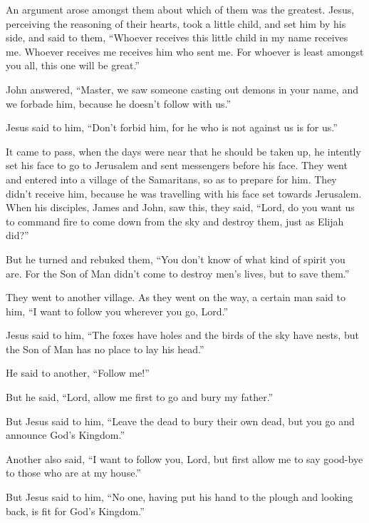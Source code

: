  An argument arose amongst them about which of them was
the greatest.  Jesus, perceiving the reasoning of their
hearts, took a little child, and set him by his side, 
and said to them, ``Whoever receives this little child in my name
receives me. Whoever receives me receives him who sent me. For whoever
is least amongst you all, this one will be great.''

 John answered, ``Master, we saw someone casting out
demons in your name, and we forbade him, because he doesn't follow with
us.''

 Jesus said to him, ``Don't forbid him, for he who is not
against us is for us.''

 It came to pass, when the days were near that he should
be taken up, he intently set his face to go to Jerusalem 
and sent messengers before his face. They went and entered into a
village of the Samaritans, so as to prepare for him. 
They didn't receive him, because he was travelling with his face set
towards Jerusalem.  When his disciples, James and John,
saw this, they said, ``Lord, do you want us to command fire to come down
from the sky and destroy them, just as Elijah did?''

 But he turned and rebuked them, ``You don't know of what
kind of spirit you are.  For the Son of Man didn't come
to destroy men's lives, but to save them.''

They went to another village.  As they went on the way, a
certain man said to him, ``I want to follow you wherever you go, Lord.''

 Jesus said to him, ``The foxes have holes and the birds
of the sky have nests, but the Son of Man has no place to lay his
head.''

 He said to another, ``Follow me!''

But he said, ``Lord, allow me first to go and bury my father.''

 But Jesus said to him, ``Leave the dead to bury their
own dead, but you go and announce God's Kingdom.''

 Another also said, ``I want to follow you, Lord, but
first allow me to say good-bye to those who are at my house.''

 But Jesus said to him, ``No one, having put his hand to
the plough and looking back, is fit for God's Kingdom.''

